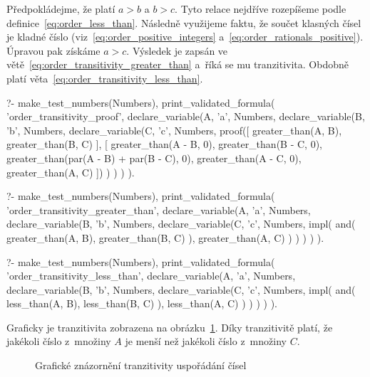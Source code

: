 Předpokládejme, že platí \(a > b\) a \(b > c\). Tyto relace nejdříve rozepíšeme podle definice~\eqref{eq:order_less_than}. Následně využijeme faktu, že součet klasných čísel je kladné číslo (viz~\eqref{eq:order_positive_integers} a~\eqref{eq:order_rationals_positive}). Úpravou pak získáme \(a > c\). Výsledek je zapsán ve větě~\eqref{eq:order_transitivity_greater_than} a~říká se mu tranzitivita. Obdobně platí věta~\eqref{eq:order_transitivity_less_than}.

\begin{prolog}
?-	make_test_numbers(Numbers),
	print_validated_formula(
		'order_transitivity_proof',
		declare_variable(A, 'a', Numbers,
			declare_variable(B, 'b', Numbers,
				declare_variable(C, 'c', Numbers,
					proof([
						greater_than(A, B),
						greater_than(B, C)
					],
					[
						greater_than(A - B, 0),
						greater_than(B - C, 0),
						greater_than(par(A - B) + par(B - C), 0),
						greater_than(A - C, 0),
						greater_than(A, C)
					])
				)
			)
		)
	).
\end{prolog}

\begin{fact}
\begin{prolog}
?-	make_test_numbers(Numbers),
	print_validated_formula(
		'order_transitivity_greater_than',
		declare_variable(A, 'a', Numbers,
			declare_variable(B, 'b', Numbers,
				declare_variable(C, 'c', Numbers,
					impl(
						and(
							greater_than(A, B),
							greater_than(B, C)
						),
						greater_than(A, C)
					)
				)
			)
		)
	).
\end{prolog}
\begin{prolog}
?-	make_test_numbers(Numbers),
	print_validated_formula(
		'order_transitivity_less_than',
		declare_variable(A, 'a', Numbers,
			declare_variable(B, 'b', Numbers,
				declare_variable(C, 'c', Numbers,
					impl(
						and(
							less_than(A, B),
							less_than(B, C)
						),
						less_than(A, C)
					)
				)
			)
		)
	).
\end{prolog}
\end{fact}

Graficky je tranzitivita zobrazena na obrázku~\ref{img:ordering_transitivity}. Díky tranzitivitě platí, že jakékoli číslo z~množiny \(A\) je menší než jakékoli číslo z~množiny \(C\).

\begin{figure}[!h]
\centering
{}
\caption{Grafické znázornění tranzitivity uspořádání čísel}
\label{img:ordering_transitivity}
\end{figure}

